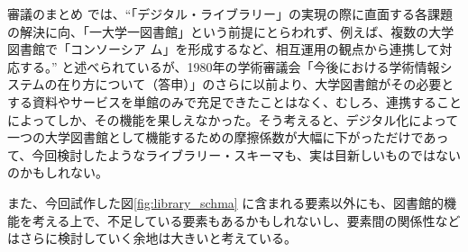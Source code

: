 \documentclass[submit,noauthor]{ono}
\begin{document}
審議のまとめ \cite{まとめ} では、``「デジタル・ライブラリー」の実現の際に直面する各課題の解決に向、「一大学一図書館」という前提にとらわれず、例えば、複数の大学図書館で「コンソーシア	ム」を形成するなど、相互運用の観点から連携して対応する。''
と述べられているが、1980年の学術審議会「今後における学術情報システムの在り方について（答申）」のさらに以前より、大学図書館がその必要とする資料やサービスを単館のみで充足できたことはなく、むしろ、連携することによってしか、その機能を果しえなかった。そう考えると、デジタル化によって一つの大学図書館として機能するための摩擦係数が大幅に下がっただけであって、今回検討したようなライブラリー・スキーマも、実は目新しいものではないのかもしれない。

また、今回試作した図\ref{fig:library_schma} に含まれる要素以外にも、図書館的機能を考える上で、不足している要素もあるかもしれないし、要素間の関係性などはさらに検討していく余地は大きいと考えている。 

	


	\onecolumn

		\begin{figure}[tb]

		\end{figure}
		
		
		\twocolumn
\end{document}
